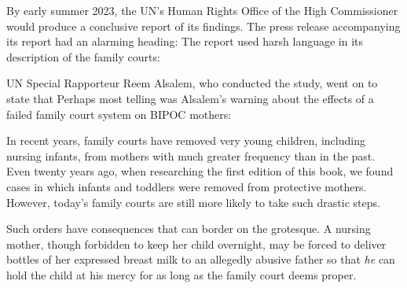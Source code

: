 By early summer 2023, the UN's Human Rights Office of the High
Commissioner would produce a conclusive report of its findings. The
press release accompanying its report had an alarming heading:
 The report used harsh language 
in its description of
the family courts:  \pfl{}

UN Special Rapporteur Reem Alsalem, who conducted the study,
went on to state that  Perhaps most telling was Alsalem's warning about the
effects of a failed family court system on BIPOC mothers: \hspace{1pt} \pfl{}

\vspace{3em}

\noindent{}In recent years, family courts have removed very young children,
including nursing infants, from mothers with much greater frequency
than in the past. Even twenty years ago, when researching the first edition of
this book, we found cases in which infants and toddlers were removed
from protective mothers. However, today’s family courts are still more
likely to take such drastic steps. \pfl{}

Such orders have consequences that can border on the grotesque. A
nursing mother, though forbidden to keep her child overnight, may be
forced to deliver bottles of her expressed breast milk to an allegedly 
abusive father so that \textit{he} can hold the child at his mercy for as long as the
family court deems proper. \pfl{}

